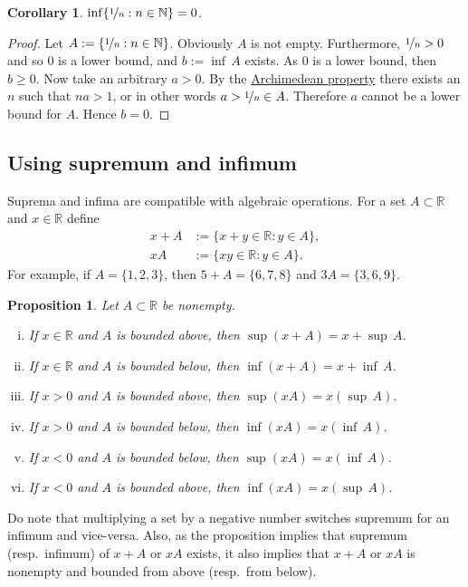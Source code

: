 \documentclass[12pt]{book}
\newcommand{\R}{{\mathbb{R}}}
\newcommand{\N}{{\mathbb{N}}}
\theoremstyle{plain}
\newtheorem{prop}[thm]{Proposition}
\newtheorem{cor}[thm]{Corollary}
\theoremstyle{remark}
\theoremstyle{definition}
\theoremstyle{exercise}
\theoremstyle{example}
\begin{document}
\begin{cor}
$\inf \{ \nicefrac{1}{n} : n \in \N \} = 0$.
\end{cor}

\begin{proof}
Let $A := \{ \nicefrac{1}{n} : n \in \N \}$.  Obviously $A$ is not empty.
Furthermore,
$\nicefrac{1}{n} > 0$ and so 0 is a lower bound, and $b := \inf\, A$ exists.
As 0 is a lower bound, then $b \geq 0$.
Now take an arbitrary $a > 0$.  By the
\hyperref[thm:arch:i]{Archimedean property} there exists an $n$ such that
$na > 1$, or in other words $a > \nicefrac{1}{n} \in A$.  Therefore
$a$ cannot be a lower bound for $A$.  Hence $b=0$.
\end{proof}

\subsection{Using supremum and infimum}

Suprema and infima are
compatible with algebraic operations.  For a set $A \subset \R$ and 
$x \in \R$ define
\begin{align*}
x + A & := \{ x+y \in \R : y \in A \} , \\
xA & := \{ xy \in \R : y \in A \} .
\end{align*}
For example, if $A = \{ 1,2,3 \}$, then $5+A = \{ 6,7,8 \}$ and $3A = \{ 3,6,9
\}$.

\begin{prop} \label{prop:supinfalg}
Let $A \subset \R$ be nonempty.
\begin{enumerate}[(i)]
\item If $x \in \R$ and $A$ is bounded above, then $\sup (x+A) = x + \sup\, A$.
\item If $x \in \R$ and $A$ is bounded below, then $\inf (x+A) = x + \inf\, A$.
\item If $x > 0$ and $A$ is bounded above, then $\sup (xA) = x ( \sup\, A )$.
\item If $x > 0$ and $A$ is bounded below, then $\inf (xA) = x ( \inf\, A )$.
\item If $x < 0$ and $A$ is bounded below, then $\sup (xA) = x ( \inf\, A )$.
\item If $x < 0$ and $A$ is bounded above, then $\inf (xA) = x ( \sup\, A )$.
\end{enumerate}
\end{prop}

Do note that multiplying a set by a negative number switches supremum for an
infimum and vice-versa.  Also, as the proposition implies that
supremum (resp.\ infimum) of $x+A$ or $xA$ exists, 
it also implies that $x+A$ or $xA$
is nonempty and bounded from above (resp.\ from below).
\end{document}
